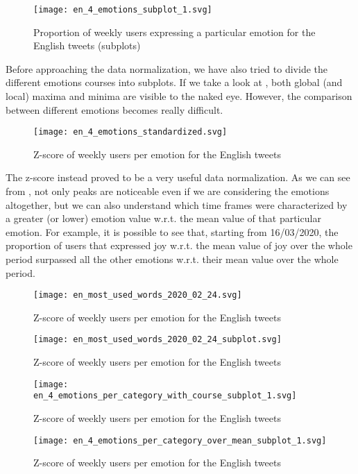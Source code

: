 \begin{figure}[H]
	\centering
    	\texttt{[image: en\_4\_emotions\_subplot\_1.svg]}
    	\caption{Proportion of weekly users expressing a particular emotion for the English tweets (subplots)}
    	\label{fig:en-4-emotions-subplot-1}
\end{figure}

Before approaching the data normalization, we have also tried to divide the different emotions courses into subplots. If we take a look at , both global (and local) maxima and minima are visible to the naked eye. However, the comparison between different emotions becomes really difficult.

\begin{figure}[H]
	\centering
    	\texttt{[image: en\_4\_emotions\_standardized.svg]}
    	\caption{Z-score of weekly users per emotion for the English tweets}
    	\label{fig:en-4-emotions-std}
\end{figure}

The z-score instead proved to be a very useful data normalization. As we can see from , not only peaks are noticeable even if we are considering the emotions altogether, but we can also understand which time frames were characterized by a greater (or lower) emotion value w.r.t. the mean value of that particular emotion. For example, it is possible to see that, starting from 16/03/2020, the proportion of users that expressed joy w.r.t. the mean value of joy over the whole period surpassed all the other emotions w.r.t. their mean value over the whole period. 

\begin{figure}[H]
	\centering
    	\texttt{[image: en\_most\_used\_words\_2020\_02\_24.svg]}
    	\caption{Z-score of weekly users per emotion for the English tweets}
    	\label{fig:en-most-used-word-2020-02-24}
\end{figure}

\begin{figure}[H]
	\centering
    	\texttt{[image: en\_most\_used\_words\_2020\_02\_24\_subplot.svg]}
    	\caption{Z-score of weekly users per emotion for the English tweets}
    	\label{fig:en-most-used-word-subplot-2020-02-24}
\end{figure}

\begin{figure}[H]
	\centering
    	\texttt{[image: en\_4\_emotions\_per\_category\_with\_course\_subplot\_1.svg]}
    	\caption{Z-score of weekly users per emotion for the English tweets}
    	\label{fig:en-4-emotions-per-category-course-subplot-1}
\end{figure}

\begin{figure}[H]
	\centering
    	\texttt{[image: en\_4\_emotions\_per\_category\_over\_mean\_subplot\_1.svg]}
    	\caption{Z-score of weekly users per emotion for the English tweets}
    	\label{fig:en-4-emotions-per-category-course-mean-1}
\end{figure}